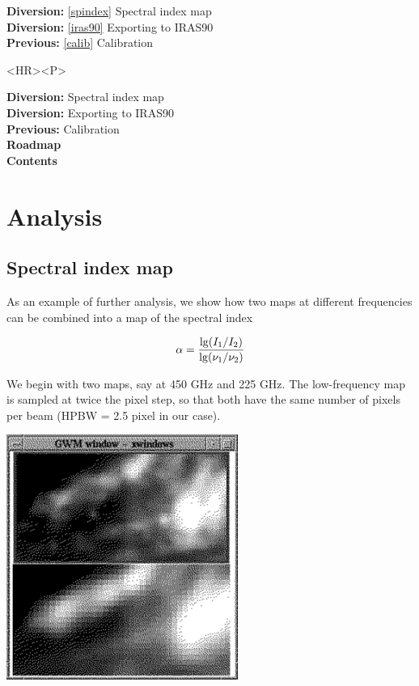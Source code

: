 \documentclass[11pt]{article}
\newcommand{\htmladdimg}[1]{}
\newenvironment{latexonly}{}{}
\newcommand{\htmlref}[2]{#1}
\newcommand{\xlabel}[1]{}
\begin{document}
\begin{latexonly}
{\bf Diversion:} \ref{spindex} Spectral index map\\
{\bf Diversion:} \ref{iras90} Exporting to IRAS90\\
{\bf Previous:} \ref{calib} Calibration\\
\end{latexonly}

\begin{htmlonly}
\begin{rawhtml} <HR><P> \end{rawhtml}
{\bf \htmlref{Diversion:}{spindex}} Spectral index map\\
{\bf \htmlref{Diversion:}{iras90}} Exporting to IRAS90\\
{\bf \htmlref{Previous:}{calib}} Calibration\\
{\bf \htmlref{Roadmap}{roadmap}}\\
{\bf \htmlref{Contents}{stardoccontents}}\\
\end{htmlonly}


\newpage
\section{Analysis}

\subsection{\label{spindex}\xlabel{spindex}Spectral index map}

   As an example of further analysis, we show how two maps at different
   frequencies can be combined into a map of the spectral index

\[\alpha = {\lg(I_1/I_2) \over \lg(\nu_1/\nu_2)}\]

   We begin with two maps, say at 450 GHz and 225 GHz. The low-frequency
   map is sampled at twice the pixel step, so that both have the same
   number of pixels per beam
\htmlref{(HPBW}{glosshpwb}
   = 2.5 pixel in our case).

\begin{latexonly}
\begin{center}
\leavevmode\includegraphics[height=80mm]{sc1_spindex1}
\end{center}
\end{latexonly}
\htmladdimg{addon/spindex1.gif}
\end{document}
